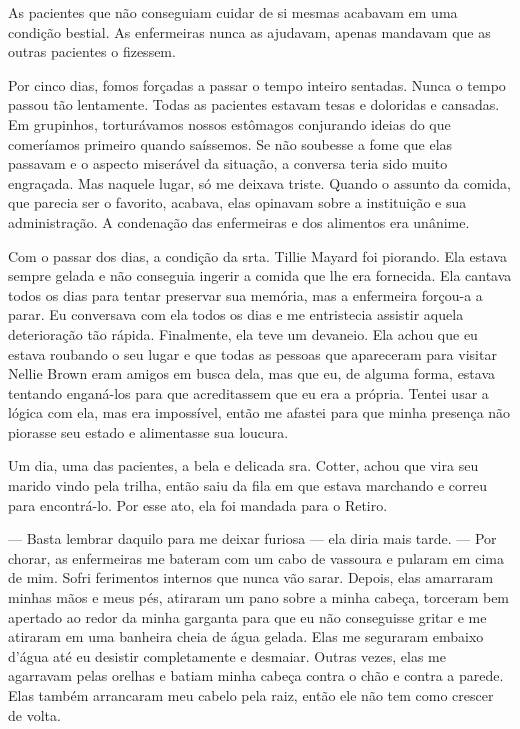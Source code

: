 As pacientes que não conseguiam cuidar de si mesmas acabavam em uma
condição bestial. As enfermeiras nunca as ajudavam, apenas mandavam que as
outras pacientes o fizessem.

Por cinco dias, fomos forçadas a passar o tempo inteiro sentadas. Nunca
o tempo passou tão lentamente. Todas as pacientes estavam tesas e
doloridas e cansadas. Em grupinhos, torturávamos nossos estômagos
conjurando ideias do que comeríamos primeiro quando saíssemos. Se não
soubesse a fome que elas passavam e o aspecto miserável da situação, a
conversa teria sido muito engraçada. Mas naquele lugar, só me deixava
triste. Quando o assunto da comida, que parecia ser o favorito, acabava,
elas opinavam sobre a instituição e sua administração. A condenação das
enfermeiras e dos alimentos era unânime.

Com o passar dos dias, a condição da srta. Tillie Mayard foi piorando.
Ela estava sempre gelada e não conseguia ingerir a comida que lhe era
fornecida. Ela cantava todos os dias para tentar preservar sua memória,
mas a enfermeira forçou-a a parar. Eu conversava com ela todos os dias e
me entristecia assistir aquela deterioração tão rápida. Finalmente, ela
teve um devaneio. Ela achou que eu estava roubando o seu lugar e que
todas as pessoas que apareceram para visitar Nellie Brown eram amigos em
busca dela, mas que eu, de alguma forma, estava tentando enganá-los para
que acreditassem que eu era a própria. Tentei usar a lógica com ela, mas
era impossível, então me afastei para que minha presença não piorasse
seu estado e alimentasse sua loucura.

Um dia, uma das pacientes, a bela e delicada sra. Cotter, achou que vira
seu marido vindo pela trilha, então saiu da fila em que estava marchando
e correu para encontrá-lo. Por esse ato, ela foi mandada para o Retiro.

--- Basta lembrar daquilo para me deixar furiosa --- ela diria mais
tarde. --- Por chorar, as enfermeiras me bateram com um cabo de vassoura
e pularam em cima de mim. Sofri ferimentos internos que nunca vão sarar.
Depois, elas amarraram minhas mãos e meus pés, atiraram um pano sobre a
minha cabeça, torceram bem apertado ao redor da minha garganta para que
eu não conseguisse gritar e me atiraram em uma banheira cheia de água
gelada. Elas me seguraram embaixo d'água até eu desistir completamente e
desmaiar. Outras vezes, elas me agarravam pelas orelhas e batiam minha
cabeça contra o chão e contra a parede. Elas também arrancaram meu
cabelo pela raiz, então ele não tem como crescer de volta.


